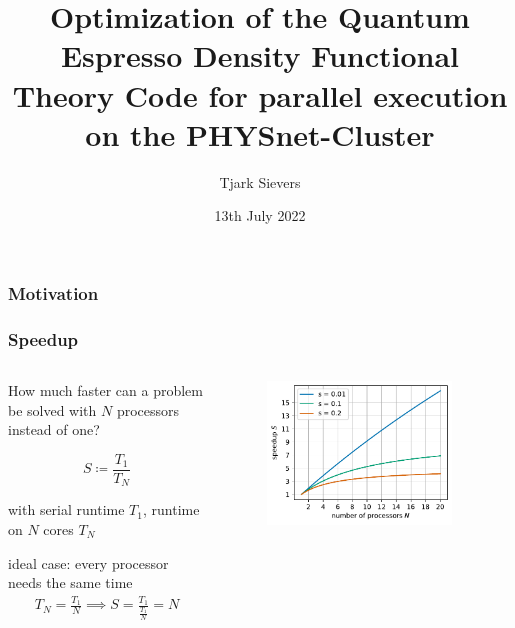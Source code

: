 \documentclass[aspectratio=169]{beamer}
\title[Bachelor's Colloquium]{Optimization of the Quantum Espresso Density Functional Theory Code for parallel execution on the PHYSnet-Cluster}
\author{Tjark Sievers}
\date{13th July 2022}
\institute[I. ITP -- AG Computational Condensed Matter Theory]{I. Institute of Theoretical Physics}
\begin{document}
{
\begin{frame}
	\titlepage
\end{frame}
}
\addtocounter{framenumber}{-1}

\begin{frame}
	\frametitle{Motivation}

	

\end{frame}

\begin{frame}
	\frametitle{Speedup}

	\begin{columns}
		\begin{column}{0.5\textwidth}
			How much faster can a problem be solved with \(N\) processors instead of one?
			
			\begin{equation}
				S \coloneqq \frac{T_1}{T_N}
			\end{equation}

			with serial runtime \(T_1\), runtime on \(N\) cores \(T_N\)

			ideal case: every processor needs the same time
			\begin{align}
				T_N = \frac{T_1}{N}
				\implies S = \frac{T_1}{\frac{T_1}{N}} = N
			\end{align}
				
		\end{column}

		\begin{column}{0.5\textwidth}
			\begin{figure}
				\centering
				\includegraphics[width=0.9\textwidth]{figs/amdahl.pdf}
				\label{fig:ideal_speedup}
			\end{figure}
		\end{column}
	\end{columns}
\end{frame}
\end{document}
